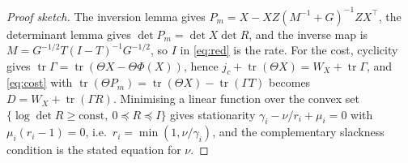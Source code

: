 \documentclass[journal]{IEEEtran}
\theoremstyle{remark}
\begin{document}
\begin{proof}[Proof sketch]
The inversion lemma gives $P_m=X-XZ(M^{-1}+G)^{-1}ZX^{\top}$, the determinant
lemma gives $\det P_m=\det X\det R$, and the inverse map is
$M=G^{-1/2}T(I-T)^{-1}G^{-1/2}$, so $I$ in \eqref{eq:red} is the rate. For the
cost, cyclicity gives $\operatorname{tr}\Gamma=\operatorname{tr}(\Theta X-\Theta\Phi(X))$,
hence $j_c+\operatorname{tr}(\Theta X)=W_X+\operatorname{tr}\Gamma$, and
\eqref{eq:cost} with $\operatorname{tr}(\Theta P_m)=\operatorname{tr}(\Theta X)-
\operatorname{tr}(\Gamma T)$ becomes $D=W_X+\operatorname{tr}(\Gamma R)$.
Minimising a linear function over the convex set
$\{\log\det R\ge\text{const},\ 0\preceq R\preceq I\}$ gives stationarity
$\gamma_i-\nu/r_i+\mu_i=0$ with $\mu_i(r_i-1)=0$, i.e.\ $r_i=\min(1,\nu/\gamma_i)$,
and the complementary slackness condition is the stated equation for $\nu$.

\end{proof}
\end{document}
